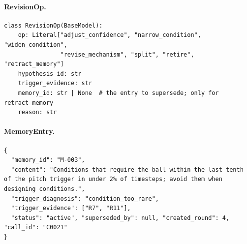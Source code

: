\documentclass[11pt]{article}
\begin{document}
\paragraph{RevisionOp.}
\begin{lstlisting}[style=json]
class RevisionOp(BaseModel):
    op: Literal["adjust_confidence", "narrow_condition", "widen_condition",
                "revise_mechanism", "split", "retire", "retract_memory"]
    hypothesis_id: str
    trigger_evidence: str
    memory_id: str | None  # the entry to supersede; only for retract_memory
    reason: str
\end{lstlisting}

\paragraph{MemoryEntry.}
\begin{lstlisting}[style=json]
{
  "memory_id": "M-003",
  "content": "Conditions that require the ball within the last tenth of the pitch trigger in under 2% of timesteps; avoid them when designing conditions.",
  "trigger_diagnosis": "condition_too_rare",
  "trigger_evidence": ["R7", "R11"],
  "status": "active", "superseded_by": null, "created_round": 4, "call_id": "C0021"
}
\end{lstlisting}
\end{document}
